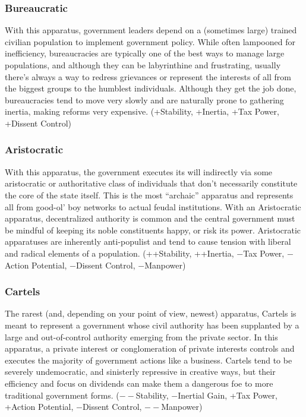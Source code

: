 \documentclass[11 pt]{scrartcl}
\begin{document}
\subsubsection*{Bureaucratic}

With this apparatus, government leaders depend on a (sometimes large) trained civilian population to implement government policy. While often lampooned for inefficiency, bureaucracies are typically one of the best ways to manage large populations, and although they can be labyrinthine and frustrating, usually there’s always a way to redress grievances or represent the interests of all from the biggest groups to the humblest individuals. Although they get the job done, bureaucracies tend to move very slowly and are naturally prone to gathering inertia, making reforms very expensive. (+Stability, +Inertia, +Tax Power, +Dissent Control)

\subsubsection*{Aristocratic}

With this apparatus, the government executes its will indirectly via some aristocratic or authoritative class of individuals that don’t necessarily constitute the core of the state itself. This is the most ``archaic'' apparatus and represents all from good-ol’ boy networks to actual feudal institutions. With an Aristocratic apparatus, decentralized authority is common and the central government must be mindful of keeping its noble constituents happy, or risk its power. Aristocratic apparatuses are inherently anti-populist and tend to cause tension with liberal and radical elements of a population. (++Stability, ++Inertia, $-$Tax Power, $-$Action Potential, $-$Dissent Control, $-$Manpower)

\subsubsection*{Cartels}

The rarest (and, depending on your point of view, newest) apparatus, Cartels is meant to represent a government whose civil authority has been supplanted by a large and out-of-control authority emerging from the private sector. In this apparatus, a private interest or conglomeration of private interests controls and executes the majority of government actions like a business. Cartels tend to be severely undemocratic, and sinisterly repressive in creative ways, but their efficiency and focus on dividends can make them a dangerous foe to more traditional government forms. ($--$Stability, $-$Inertial Gain, +Tax Power, +Action Potential, $-$Dissent Control, $--$Manpower)
\end{document}
